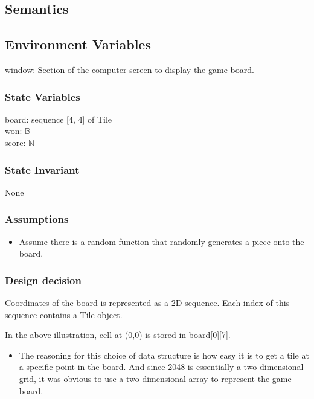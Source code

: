 \documentclass[12pt]{article}
\begin{document}
\subsection* {Semantics}

\subsection* {Environment Variables}

window: Section of the computer screen to display the game board.

\subsubsection* {State Variables}

board: sequence [4, 4] of Tile \\
won: $\mathbb{B}$\\
score: $\mathbb{N}$\\

\subsubsection* {State Invariant}

None

\subsubsection* {Assumptions}

\begin{itemize}
  \item Assume there is a random function that randomly generates a piece onto the board.
\end{itemize}

\subsubsection* {Design decision}

Coordinates of the board is represented as a 2D sequence. Each index of this sequence contains a Tile object.

\begin{center}
  In the above illustration, cell at (0,0) is stored in board[0][7].
\end{center}

\begin{itemize}
  \item The reasoning for this choice of data structure is how easy it is to get a tile at a specific point in the board. And since 2048 is essentially a two dimensional grid, it was obvious to use a two dimensional array to represent the game board.
\end{itemize}
\end{document}
